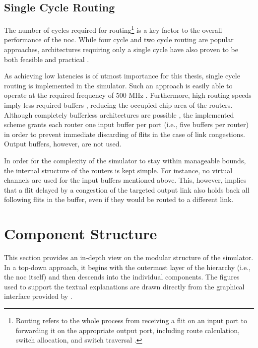 \subsection{Single Cycle Routing}
The number of cycles required for routing\footnote{Routing refers to the whole process from receiving a flit on an input port to forwarding it on the
appropriate output port, including route calculation, switch allocation, and switch traversal \cite[see][2]{routinglectureutah}.} is a key factor to the
overall performance of the \gls{noc}. While four cycle \cite[e.g.][]{routinglectureutah} and two cycle routing \cite[e.g.][]{lu11nocrouter} are
popular approaches, architectures requiring only a single cycle have also proven to be both feasible and practical
\cites{hayenga09scarab}{ved17routeonfly}.

As achieving low latencies is of utmost importance for this thesis, single cycle routing is implemented in the simulator. Such an approach is easily
able to operate at the required frequency of 500 MHz \cite[7]{hayenga09scarab}. Furthermore, high routing speeds imply less required buffers
\cite[1]{ved17routeonfly}, reducing the occupied chip area of the routers. Although completely bufferless architectures are possible
\cite{hayenga09scarab}, the implemented scheme grants each router one input buffer per port (i.e., five buffers per router) in order to prevent
immediate discarding of flits in the case of link congestions. Output buffers, however, are not used.

In order for the complexity of the simulator to stay within manageable bounds, the internal structure of the routers is kept simple. For instance, no
virtual channels are used for the input buffers mentioned above. This, however, implies that a flit delayed by a congestion of the targeted output
link also holds back all following flits in the buffer, even if they would be routed to a different link.

\section{Component Structure}\label{sec:componentstructure}
This section provides an in-depth view on the modular structure of the simulator. In a top-down approach, it begins with the outermost layer of the
hierarchy (i.e., the \gls{noc} itself) and then descends into the individual components. The figures used to support the textual explanations are
drawn directly from the graphical interface provided by \omnet{}.

